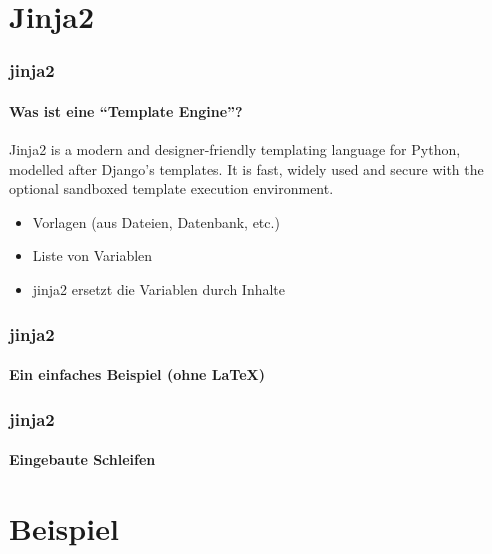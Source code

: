 \documentclass[12pt,ngerman]{beamer}
\begin{document}
\section{Jinja2}


\begin{frame}
\frametitle{jinja2}
\framesubtitle{Was ist eine \enquote{Template Engine}?}

\begin{infobox}
Jinja2 is a modern and designer-friendly templating language for Python, modelled after Django’s templates. It is fast, widely used and secure with the optional sandboxed template execution environment.
\end{infobox}

\begin{itemize}
	\item Vorlagen (aus Dateien, Datenbank, etc.)
	\item Liste von Variablen
	\item jinja2 ersetzt die Variablen durch Inhalte
\end{itemize}

\end{frame}

\begin{frame}[fragile]
\frametitle{jinja2}
\framesubtitle{Ein einfaches Beispiel (ohne \LaTeX)}

 

 

\end{frame}

\begin{frame}[fragile]
\frametitle{jinja2}
\framesubtitle{Eingebaute Schleifen}

 

\end{frame}




\section{Beispiel}
\end{document}

